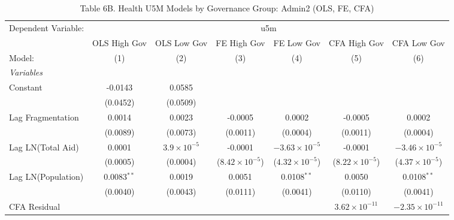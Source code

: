 \begin{table}[H]
   \caption{Table 6B. Health U5M Models by Governance Group: Admin2 (OLS, FE, CFA)}
   \centering
   \begin{tabular}{lcccccc}
      \tabularnewline \midrule \midrule
      Dependent Variable: & \multicolumn{6}{c}{u5m}\\
                         & OLS High Gov  & OLS Low Gov          & FE High Gov             & FE Low Gov              & CFA High Gov             & CFA Low Gov \\   
      Model:             & (1)           & (2)                  & (3)                     & (4)                     & (5)                      & (6)\\  
      \midrule
      \emph{Variables}\\
      Constant           & -0.0143       & 0.0585               &                         &                         &                          &   \\   
                         & (0.0452)      & (0.0509)             &                         &                         &                          &   \\   
      Lag Fragmentation  & 0.0014        & 0.0023               & -0.0005                 & 0.0002                  & -0.0005                  & 0.0002\\   
                         & (0.0089)      & (0.0073)             & (0.0011)                & (0.0004)                & (0.0011)                 & (0.0004)\\   
      Lag LN(Total Aid)  & 0.0001        & $3.9\times 10^{-5}$  & -0.0001                 & $-3.63\times 10^{-5}$   & -0.0001                  & $-3.46\times 10^{-5}$\\    
                         & (0.0005)      & (0.0004)             & ($8.42\times 10^{-5}$)  & ($4.32\times 10^{-5}$)  & ($8.22\times 10^{-5}$)   & ($4.37\times 10^{-5}$)\\    
      Lag LN(Population) & 0.0083$^{**}$ & 0.0019               & 0.0051                  & 0.0108$^{**}$           & 0.0050                   & 0.0108$^{**}$\\   
                         & (0.0040)      & (0.0043)             & (0.0111)                & (0.0041)                & (0.0110)                 & (0.0041)\\   
      CFA Residual       &               &                      &                         &                         & $3.62\times 10^{-11}$    & $-2.35\times 10^{-11}$\\    

\end{tabular}
\end{table}
